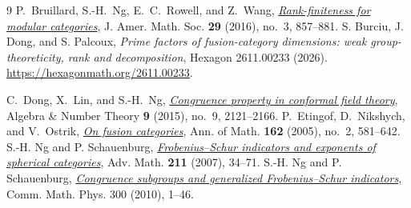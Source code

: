 \documentclass[11pt]{amsart}
\numberwithin{equation}{section}
\begin{document}
\begin{thebibliography}{9}
P.~Bruillard, S.-H.~Ng, E.~C.~Rowell, and Z.~Wang,
\href{https://doi.org/10.1090/jams/842}{\emph{Rank-finiteness for modular categories}},
J. Amer. Math. Soc. \textbf{29} (2016), no.~3, 857--881.
 S. Burciu, J. Dong, and S. Palcoux, \emph{Prime factors of fusion-category dimensions: weak group-theoreticity, rank and decomposition}, Hexagon 2611.00233 (2026). \url{https://hexagonmath.org/2611.00233}.

C.~Dong, X.~Lin, and S.-H.~Ng,
\href{https://doi.org/10.2140/ant.2015.9.2121}{\emph{Congruence property in conformal field theory}},
Algebra \& Number Theory \textbf{9} (2015), no.~9, 2121--2166.
P.~Etingof, D.~Nikshych, and V.~Ostrik,
\href{https://doi.org/10.4007/annals.2005.162.581}{\emph{On fusion categories}},
Ann. of Math. \textbf{162} (2005), no.~2, 581--642.
S.-H. Ng and P. Schauenburg, \href{https://doi.org/10.1016/j.aim.2006.07.017}{\emph{Frobenius--Schur indicators and exponents of spherical categories}}, Adv. Math. \textbf{211} (2007), 34--71.
S.-H. Ng and P. Schauenburg, \href{https://doi.org/10.1007/s00220-010-1096-6}{\emph{Congruence subgroups and generalized Frobenius--Schur indicators}}, Comm. Math. Phys. 300 (2010), 1--46.
\end{thebibliography}
\end{document}

